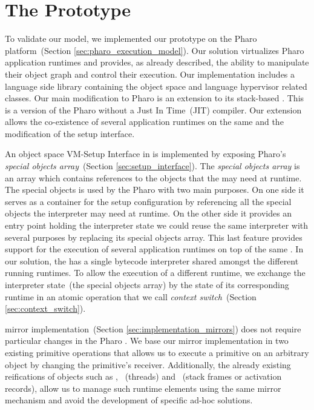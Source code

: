
\chapter{The \Vtt Prototype}
\minitoc
{}
\introduction

To validate our model, we implemented our \Vtt prototype on the Pharo platform~(Section \ref{sec:pharo_execution_model}). Our solution virtualizes Pharo application runtimes and provides, as already described, the ability to manipulate their object graph and control their execution. Our implementation includes a language side library containing the object space and language hypervisor related classes. Our main modification to Pharo is an extension to its stack-based \VM. This \VM is a version of the Pharo \VM without a Just In Time~(JIT) compiler. Our extension allows the co-existence of several application runtimes on the same \VM and the modification of the \VM setup interface.

An object space VM-Setup Interface in \Vtt is implemented by exposing Pharo's \emph{special objects array}~(Section \ref{sec:setup_interface}). The \emph{special objects array} is an array which contains references to the objects that the \VM may need at runtime. The special objects is used by the Pharo \VM with two main purposes. On one side it serves as a container for the \VM setup configuration by referencing all the special objects the interpreter may need at runtime. On the other side it provides an entry point holding the \VM interpreter state \ie we could reuse the same interpreter with several purposes by replacing its special objects array. This last feature provides support for the execution of several application runtimes on top of the same \VM. In our solution, the \VM has a single bytecode interpreter shared amongst the different running runtimes. To allow the execution of a different runtime, we exchange the interpreter state~(the special objects array) by the state of its corresponding runtime in an atomic operation that we call \emph{context switch}~(Section \ref{sec:context_switch}).

\Vtt mirror implementation~(Section \ref{sec:implementation_mirrors}) does not require particular changes in the Pharo \VM. We base our mirror implementation in two existing \VM primitive operations that allows us to execute a primitive on an arbitrary object by changing the primitive's receiver. Additionally, the already existing reifications of objects such as , ~(threads) and ~(stack frames or activation records), allow us to manage such runtime elements using the same mirror mechanism and avoid the development of specific ad-hoc solutions.


